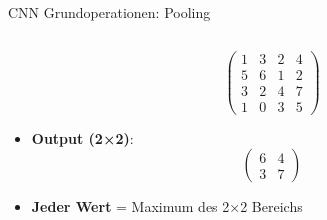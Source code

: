 \documentclass[aspectratio=1610, xcolor=dvipsnames, 9pt]{beamer}
\begin{document}
\begin{frame}{CNN Grundoperationen: Pooling}
\begin{columns}
\begin{column}{0.35\textwidth}
\begin{itemize}
\begin{equation*}
                \begin{pmatrix}
                  1 & 3 & 2 & 4 \\
                  5 & 6 & 1 & 2 \\
                  3 & 2 & 4 & 7 \\
                  1 & 0 & 3 & 5
                \end{pmatrix}
              \end{equation*}
              \item \textbf{Output (2×2)}:
              \begin{equation*}
                \begin{pmatrix}
                  6 & 4 \\
                  3 & 7
                \end{pmatrix}
              \end{equation*}
              \item \textbf{Jeder Wert} = Maximum des 2×2 Bereichs
            \end{itemize}
          \end{column}
        \end{columns}
      \end{frame}
      
\end{document}
